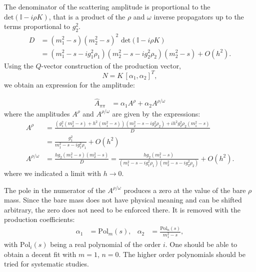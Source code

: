 \documentclass[aps,prd,superscriptaddress,onecolumn,nofootinbib,preprintnumbers,notitlepage]{revtex4-1}
\begin{document}
The denominator of the scattering amplitude is proportional to the $\text{det}(\mathbb{I}-i\rho K)$,
that is a product of the $\rho$ and $\omega$ inverse propagators up to the terms proportional to $g_2^2$.
\begin{align}
  D & = (m_1^2-s)(m_2^2-s)^2\,\,\text{det}(\mathbb{I}-i\rho K) \\\nonumber
    &= (m_1^2-s-ig_1^2\rho_1)(m_2^2-s-ig_2^2\rho_2)(m_2^2-s) + O(h^2).
\end{align}
Using the $Q$-vector construction of the production vector,
\begin{equation}
  N = K\,[\alpha_1, \alpha_2]^T,
\end{equation}
we obtain an expression for the amplitude:

\begin{align}
\hat{A}_{\pi\pi} &= \alpha_{1} A^\rho + \alpha_{2} A^{\rho/\omega}
\end{align}
where the amplitudes $A^\rho$ and $A^{\rho/\omega}$ are given by the expressions:
\begin{align}
  A^\rho &= \frac{\left(g_{1}^{2} \left(m_{2}^{2} - s\right) + h^{2} \left(m_{1}^{2} - s\right)\right)
    \left(m_{2}^{2} - s - i g_2^{2} \rho_{2}\right) + i h^{2} g_2^{2} \rho_{2} (m_{1}^{2} - s)}{D}
    \\ \nonumber &
    = \frac{g_1^2}{m_1^2-s-ig_1^2\rho_1} + O(h^2) \\ \nonumber
  A^{\rho/\omega} &= \frac{h g_2 \left(m_{1}^{2} - s\right) \left(m_{2}^{2} - s\right)}{D} =
  \frac{h g_2 (m_1^2-s)}{(m_1^2-s-ig_1^2\rho_1)(m_2^2-s-ig_2^2\rho_2)} + O(h^2).
\end{align}
where we indicated a limit with $h\to 0$.

The pole in the numerator of the $A^{\rho/\omega}$ produces a zero at the value of the bare $\rho$ mass.
Since the bare mass does not have physical meaning and can be shifted arbitrary,
the zero does not need to be enforced there. It is removed with the production coefficients:
\begin{align}
  \alpha_1 &= \text{Pol}_m(s), & \alpha_2 &= \frac{\text{Pol}_n(s)}{m_1^2-s},
\end{align}
with $\text{Pol}_i(s)$ being a real polynomial of the order $i$.
One should be able to obtain a decent fit with $m=1$, $n=0$.
The higher order polynomials should be tried for systematic studies.
%
\end{document}
